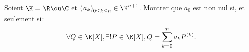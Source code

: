 \begin{enonce}
\begin{exercise}[ID={RMS125 E639, 2014 Mines-Ponts PSI},subtitle={2014 Mines-Ponts PSI},tags={}]
Soient $\K=\R\ou\C$ et $\left( a_k \right)_{0\leq k\leq n}\in\K^{n+1}$.
Montrer que $a_0$ est non nul si, et seulement si:
\begin{equation*}
\forall Q\in\K[X], \exists!P\in\K[X], Q=\sum_{k=0}^n a_k P^{(k)}.
\end{equation*}
\end{exercise}
\begin{solution}
\end{solution}
\end{enonce}
